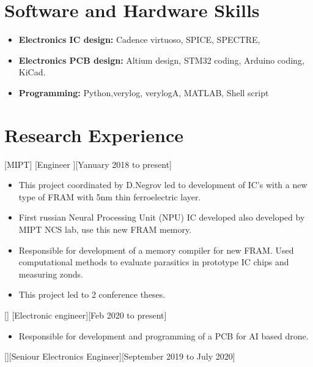 \documentclass{article}
\begin{document}
\section{Software and Hardware Skills} 
\begin{itemize}
\item \textbf{Electronics IC design:} Cadence virtuoso, SPICE, SPECTRE, 
\item \textbf{Electronics PCB design:} Altium design, STM32 coding, Arduino coding, KiCad.
\item \textbf{Programming:} Python,verylog, verylogA, MATLAB, Shell script
\end{itemize}
 
\section{Research Experience}

[MIPT]
[Engineer ][Yanuary 2018 to present]

\begin{itemize}
\item This project coordinated by D.Negrov led to development of IC's with a new type of FRAM with 5nm thin ferroelectric layer.
\item First russian Neural Processing Unit (NPU) IC developed also developed by MIPT NCS lab, use this new FRAM memory. 
\item Responsible for development of a memory compiler for new FRAM. Used computational methods to evaluate parasitics in prototype IC chips and measuring zonds.
\item This project led to 2 conference theses.
\end{itemize}


[]
[Electronic engineer][Feb 2020 to present]

\begin{itemize}
\item Responsible for development and programming of a PCB for AI based drone.
\end{itemize}

[][Seniour Electronics Engineer][September 2019 to July 2020]
\end{document}
